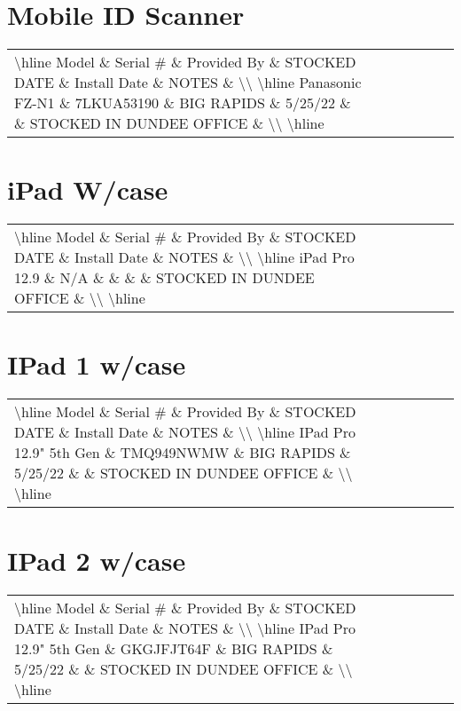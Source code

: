 \documentclass{article}%
\begin{document}
%
\section{Mobile ID Scanner}%
\label{sec:MobileIDScanner}%
\begin{tabularx}{\textwidth}{|X|X|X|X|X|X|X|}%
\textbackslash{}hline%
Model \& Serial \# \& Provided By \& STOCKED DATE \& Install Date \& NOTES \&  \textbackslash{}\textbackslash{}%
\textbackslash{}hline%
Panasonic FZ{-}N1 \& 7LKUA53190 \& BIG RAPIDS \& 5/25/22 \&  \& STOCKED IN DUNDEE OFFICE \&  \textbackslash{}\textbackslash{}%
\textbackslash{}hline%
\end{tabularx}

%
\section{iPad W/case}%
\label{sec:iPadW/case}%
\begin{tabularx}{\textwidth}{|X|X|X|X|X|X|X|}%
\textbackslash{}hline%
Model \& Serial \# \& Provided By \& STOCKED DATE \& Install Date \& NOTES \&  \textbackslash{}\textbackslash{}%
\textbackslash{}hline%
iPad Pro 12.9 \& N/A \&  \&  \&  \& STOCKED IN DUNDEE OFFICE \&  \textbackslash{}\textbackslash{}%
\textbackslash{}hline%
\end{tabularx}

%
\section{IPad 1 w/case}%
\label{sec:IPad1w/case}%
\begin{tabularx}{\textwidth}{|X|X|X|X|X|X|X|}%
\textbackslash{}hline%
Model \& Serial \# \& Provided By \& STOCKED DATE \& Install Date \& NOTES \&  \textbackslash{}\textbackslash{}%
\textbackslash{}hline%
IPad Pro 12.9" 5th Gen \& TMQ949NWMW \& BIG RAPIDS \& 5/25/22 \&  \& STOCKED IN DUNDEE OFFICE \&  \textbackslash{}\textbackslash{}%
\textbackslash{}hline%
\end{tabularx}

%
\section{IPad 2 w/case}%
\label{sec:IPad2w/case}%
\begin{tabularx}{\textwidth}{|X|X|X|X|X|X|X|}%
\textbackslash{}hline%
Model \& Serial \# \& Provided By \& STOCKED DATE \& Install Date \& NOTES \&  \textbackslash{}\textbackslash{}%
\textbackslash{}hline%
IPad Pro 12.9" 5th Gen \& GKGJFJT64F \& BIG RAPIDS \& 5/25/22 \&  \& STOCKED IN DUNDEE OFFICE \&  \textbackslash{}\textbackslash{}%
\textbackslash{}hline%
\end{tabularx}
\end{document}

